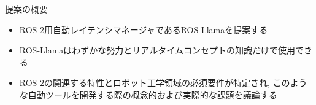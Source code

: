 

\begin{frame}{提案の概要}
    \begin{itemize}
        \item ROS 2用自動レイテンシマネージャであるROS-Llamaを提案する
        \item ROS-Llamaはわずかな努力とリアルタイムコンセプトの知識だけで使用できる
        \item ROS 2の関連する特性とロボット工学領域の必須要件が特定され, このような自動ツールを開発する際の概念的および実際的な課題を議論する
    \end{itemize}
\end{frame}
